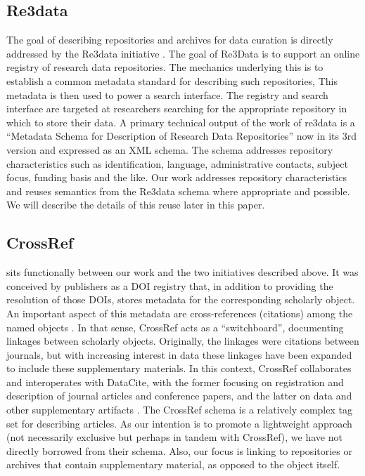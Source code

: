 \subsection{Re3data}
The goal of describing repositories and archives for data curation is directly addressed by the Re3data initiative \parencite{RucknagelMetadataSchemaDescription2015,Re3data.Orgre3dataorgMetadata2015}.  The goal of Re3Data is to support an online registry of research data repositories.   The mechanics underlying this is to establish a common metadata standard for describing such repositories, This metadata is then used to power a search interface.  The registry and search interface are targeted at researchers searching for the appropriate repository in which to store their data.
A primary technical output of the work of re3data is a ``Metadata Schema for Description of Research Data Repositories'' now in its 3rd version and expressed as an XML schema.  The schema addresses repository characteristics such as identification,   language, administrative contacts, subject focus, funding basis and the like.  Our work addresses repository characteristics and reuses semantics from the Re3data schema where appropriate and possible.  We will describe the details of this reuse later in this paper.

\subsection{CrossRef}
  sits functionally between our work and the two initiatives described above.  It was conceived by publishers as a DOI registry that, in addition to providing the resolution of those DOIs, stores metadata for the corresponding scholarly object.  An important aspect of this metadata are cross-references (citations) among the named objects \parencite{CrossRefRelationshipsDOIsother}.  In that sense, CrossRef acts as a ``switchboard'', documenting linkages between scholarly objects. Originally, the linkages were citations between journals, but with increasing interest in data these linkages have been expanded to include these supplementary materials.  In this context, CrossRef collaborates and interoperates with DataCite, with the former focusing on registration and description of journal articles and conference papers, and the latter on data and other supplementary artifacts .  The CrossRef schema is a relatively complex tag set for describing articles.  As our intention is to promote a lightweight approach (not necessarily exclusive but perhaps in tandem with CrossRef), we have not directly borrowed from their schema.  Also, our focus is linking to repositories or archives that contain supplementary material, as opposed to the object itself.

